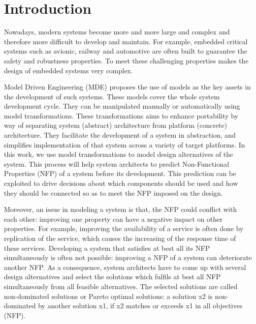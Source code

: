 \documentclass[conference]{IEEEtran}
\begin{document}
\IEEEpeerreviewmaketitle

\section{Introduction}


Nowadays, modern systems become more and more large and complex and therefore more difficult to develop and maintain. For example, embedded critical systems such as avionic, railway and automotive are often built to guarantee the safety and robustness properties. To meet these challenging properties makes the design of embedded systems very complex.

Model Driven Engineering (MDE) proposes the use of models as the key assets in the development of such systems. These models cover the whole system development cycle. They can be manipulated manually or automatically using model transformations. These transformations aims to enhance portability by way of separating system (abstract) architecture from platform (concrete) architecture. They facilitate the development of a system in abstraction, and simplifies implementation of that system across a variety of target platforms. In this work, we use model transformations to model design alternatives of the system. This process will help system architects to predict Non-Functional Properties (NFP) of a system before its development\cite{1291833}. This prediction can be exploited to drive decisions about which components should be used and how they should be connected so as to meet the NFP imposed on the design.


Moreover, an issue in modeling a system is that, the NFP could conflict with each other: improving one property can have a negative impact on other properties. For example, improving the availability of a service is often done by replication of the service, which causes the increasing of the response time of these services\cite{Yu:2001:CLA:502059.502038}. Developing a system that satisfies at best all its NFP simultaneously is often not possible: improving a NFP of a system can deteriorate another NFP. As a consequence, system architects have to come up with several design alternatives and select the solutions which fulfils at best all NFP\cite{Coello98acomprehensive} simultaneously from all feasible alternatives. The selected solutions are called non-dominated solutions or Pareto optimal solutions: a solution x2 is non-dominated by another solution x1, if x2 matches or exceeds x1 in all objectives (NFP).
\end{document}
